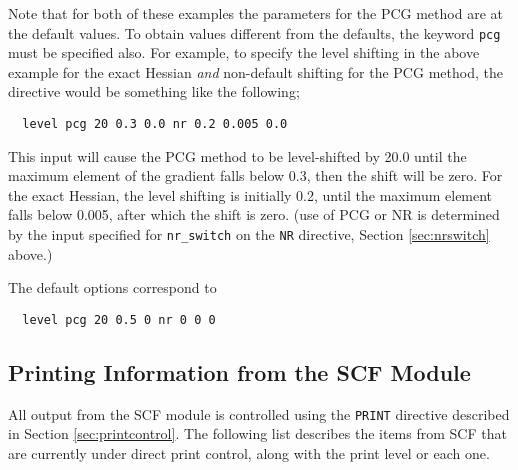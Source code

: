 Note that for both of these examples the parameters for the PCG method
are at the default values.  To obtain values different from the
defaults, the keyword \verb+pcg+ must be specified also.  For example,
to specify the level shifting in the above example for the exact
Hessian {\em and} non-default shifting for the PCG method, the
directive would be something like the following;

\begin{verbatim}
  level pcg 20 0.3 0.0 nr 0.2 0.005 0.0
\end{verbatim}

This input will cause the PCG method to be level-shifted by 20.0 until
the maximum element of the gradient falls below 0.3, then the shift
will be zero.  For the exact Hessian, the level shifting is initially
0.2, until the maximum element falls below 0.005, after which the
shift is zero.  (use of PCG or NR is determined by the input specified
for \verb+nr_switch+ on the \verb+NR+ directive, Section
\ref{sec:nrswitch} above.)

The default options correspond to
\begin{verbatim}
  level pcg 20 0.5 0 nr 0 0 0
\end{verbatim}


\subsection{Printing Information from the SCF Module}
\label{sec:scfprint}

All output from the SCF module is controlled using the \verb+PRINT+
directive described in Section \ref{sec:printcontrol}.  The following 
list describes the items from SCF that are currently under direct 
print control, along with the print level or each one.

